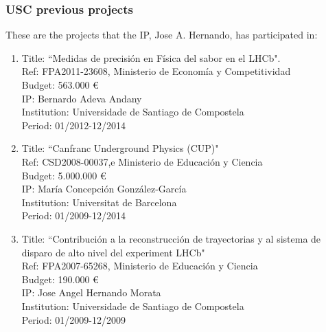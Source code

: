 %
%

\subsubsection*{USC previous projects}

These are the projects that the IP, Jose A. Hernando, has participated in:

\begin{enumerate}

\item Title: ``Medidas de precisi\'on en F\'isica del sabor en el LHCb". \\
Ref:  FPA2011-23608, Ministerio de Econom\'ia y Competitividad \\
Budget: 563.000 \euro \\
IP: Bernardo Adeva Andany \\
Institution: Universidade de Santiago de Compostela \\
Period: 01/2012-12/2014

\item Title: ``Canfranc Underground Physics (CUP)"\\
Ref:  CSD2008-00037,e Ministerio de Educaci\'on y Ciencia \\
Budget: 5.000.000 \euro \\
IP: Mar\'ia Concepci\'on Gonz\'alez-Garc\'ia \\
Institution: Universitat de Barcelona \\
Period: 01/2009-12/2014

\item Title: ``Contribuci\'on a la reconstrucci\'on de trayectorias y al sistema de disparo de alto nivel del experiment LHCb" \\
Ref:  FPA2007-65268, Ministerio de Educaci\'on y Ciencia \\
Budget:  190.000 \euro \\
IP: Jose Angel Hernando Morata \\ 
Institution: Universidade de Santiago de Compostela \\
Period: 01/2009-12/2009

\end{enumerate}
